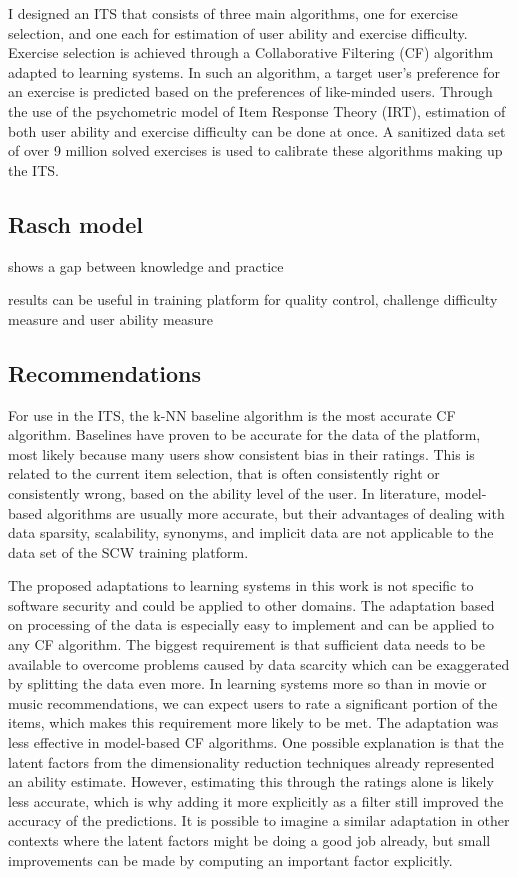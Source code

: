 I designed an ITS that consists of three main algorithms, one for
exercise selection, and one each for estimation of user ability and
exercise difficulty. Exercise selection is achieved through a Collaborative Filtering (CF) algorithm adapted to learning systems. In
such an algorithm, a target user’s preference for an exercise is predicted based on the preferences of like-minded users. Through the
use of the psychometric model of Item Response Theory (IRT),
estimation of both user ability and exercise difficulty can be done
at once. A sanitized data set of over 9 million solved exercises is
used to calibrate these algorithms making up the ITS.

\subsection{Rasch model}
shows a gap between knowledge and practice

results can be useful in training platform for quality control, challenge difficulty measure and user ability measure

\subsection{Recommendations}
For use in the ITS, the k-NN baseline algorithm is the most accurate CF algorithm. Baselines have proven to be accurate for the
data of the platform, most likely because many users show consistent bias in their ratings. This is related to the current item
selection, that is often consistently right or consistently wrong,
based on the ability level of the user. In literature, model-based
algorithms are usually more accurate, but their advantages of dealing with data sparsity, scalability, synonyms, and implicit data
are not applicable to the data set of the SCW training platform.

The proposed adaptations to learning systems in this work is not specific
to software security and could be applied to other domains. The adaptation based on processing of the data is especially easy to implement
and can be applied to any CF algorithm. The biggest requirement is
that sufficient data needs to be available to overcome problems caused
by data scarcity which can be exaggerated by splitting the data even
more. In learning systems more so than in movie or music recommendations, we can expect users to rate a significant portion of the items,
which makes this requirement more likely to be met.
The adaptation was less effective in model-based CF algorithms. One
possible explanation is that the latent factors from the dimensionality
reduction techniques already represented an ability estimate. However,
estimating this through the ratings alone is likely less accurate, which is
why adding it more explicitly as a filter still improved the accuracy of
the predictions. It is possible to imagine a similar adaptation in other
contexts where the latent factors might be doing a good job already,
but small improvements can be made by computing an important factor
explicitly.

